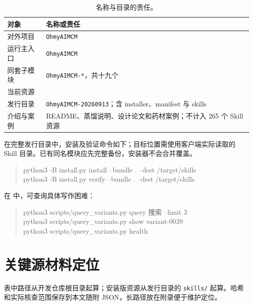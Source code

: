 \documentclass[UTF8,a4paper,zihao=-4,fontset=fandol]{ctexart}
\newcommand{\code}[1]{\texttt{\small #1}}
\begin{document}
\begin{table}[htbp]\centering\small
\caption{名称与目录的责任。}\label{tab:names}
\begin{tabularx}{\linewidth}{@{}p{30mm}Y@{}}\toprule
对象 & 名称或责任\\\midrule
对外项目 & \code{OhmyAIMCM}\\
运行主入口 & \code{OhmyAIMCM}\\
同套子模块 & \code{OhmyAIMCM-*}，共十九个\\
当前资源 & \\
发行目录 & \code{OhmyAIMCM-20260913}；含 installer、manifest 与 skills\\
介绍与案例 & README、蒸馏说明、设计论文和药材案例；不计入 265 个 Skill 资源\\
\bottomrule\end{tabularx}\end{table}

在完整发行目录中，安装及验证命令如下；目标位置需使用客户端实际读取的 Skill 目录。已有同名模块应先完整备份，安装器不会合并覆盖。

\begin{quote}\small\ttfamily
python3 -B install.py install --bundle . --dest /target/skills\\
python3 -B install.py verify --bundle . --dest /target/skills
\end{quote}

在  中，可查询具体写作困难：
\begin{quote}\small\ttfamily
python3 scripts/query\_variants.py query 搜索 --limit 3\\
python3 scripts/query\_variants.py show variant-0039\\
python3 scripts/query\_variants.py health
\end{quote}

\section{关键源材料定位}

表中路径从开发仓库根目录起算；安装版资源从发行目录的 \code{skills/} 起算。哈希和实际核查范围保存到本文随附 JSON，长路径放在附录便于维护定位。
\end{document}
